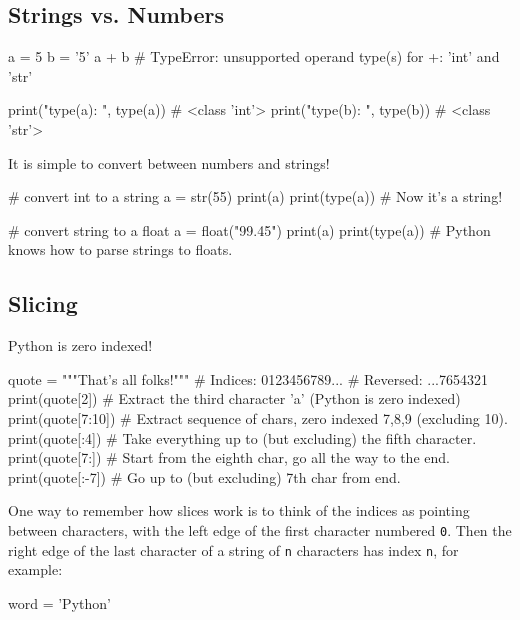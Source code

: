 \documentclass[12pt]{article} \newif\ifsolution\solutiontrue %
\begin{document}
\subsection{Strings vs. Numbers}
\begin{python}
a = 5
b = '5'
a + b
# TypeError: unsupported operand type(s) for +: 'int' and 'str'
\end{python}

\begin{python}
print("type(a): ", type(a))  # <class 'int'>
print("type(b): ", type(b))  # <class 'str'>
\end{python}

It is simple to convert between numbers and strings!

\begin{python}
# convert int to a string
a = str(55)
print(a)
print(type(a))  # Now it's a string!
\end{python}

\begin{python}
# convert string to a float
a = float("99.45")
print(a)
print(type(a))  # Python knows how to parse strings to floats.
\end{python}

\subsection{Slicing}

Python is zero indexed!

\begin{python}
quote = """That's all folks!"""
# Indices: 0123456789...
# Reversed:       ...7654321
print(quote[2])     # Extract the third character 'a' (Python is zero indexed)
print(quote[7:10])  # Extract sequence of chars, zero indexed 7,8,9 (excluding 10).
print(quote[:4])    # Take everything up to (but excluding) the fifth character.
print(quote[7:])    # Start from the eighth char, go all the way to the end.
print(quote[:-7])   # Go up to (but excluding) 7th char from end.
\end{python}

One way to remember how slices work is to think of the indices as pointing
between characters, with the left edge of the first character numbered \texttt{0}. Then
the right edge of the last character of a string of \texttt{n} characters has index
\texttt{n}, for example:

\begin{python}
word = 'Python'
\end{python}
\end{document}
